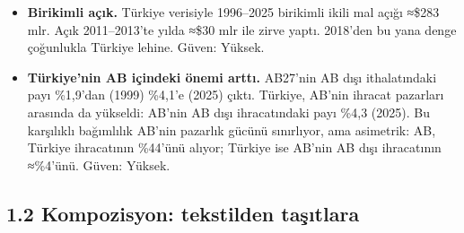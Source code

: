 \begin{itemize}
  Müzakerede AB kendi rakamını kullanacak. Faz 7'nin argümanı iki ölçüyü birlikte vermeli. \etiketV{} Güven: Yüksek.
\item
  \textbf{Birikimli açık.} Türkiye verisiyle 1996--2025 birikimli ikili mal açığı ≈\$283 mlr. Açık 2011--2013'te yılda ≈\$30 mlr ile zirve yaptı. 2018'den bu yana denge çoğunlukla Türkiye lehine. \etiketV{} Güven: Yüksek.
\item
  \textbf{Türkiye'nin AB içindeki önemi arttı.} AB27'nin AB dışı ithalatındaki payı \%1,9'dan (1999) \%4,1'e (2025) çıktı. Türkiye, AB'nin ihracat pazarları arasında da yükseldi: AB'nin AB dışı ihracatındaki payı \%4,3 (2025). Bu karşılıklı bağımlılık AB'nin pazarlık gücünü sınırlıyor, ama asimetrik: AB, Türkiye ihracatının \%44'ünü alıyor; Türkiye ise AB'nin AB dışı ihracatının ≈\%4'ünü. \etiketV{} Güven: Yüksek.
\end{itemize}

\hypertarget{01_teshis-12-kompozisyon-tekstilden-taux15fux131tlara}{%
\subsection{1.2 Kompozisyon: tekstilden taşıtlara}\label{01_teshis-12-kompozisyon-tekstilden-taux15fux131tlara}}

\begingroup\gbtablo\footnotesize

